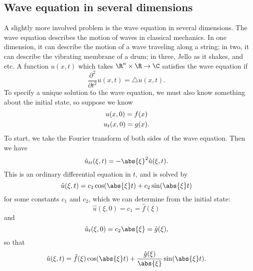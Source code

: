 \subsection{Wave equation in several dimensions}
A slightly more involved problem is the wave equation in several dimensions. The wave equation describes the motion of waves in classical mechanics. In one dimension, it can describe the motion of a wave traveling along a string; in two, it can describe the vibrating membrane of a drum; in three, Jello as it shakes, and etc. A function $u(x, t)$ which takes $\R^n \times \R \to \C$ satisfies the wave equation if
\begin{equation}
\frac{\partial^2}{\partial t^2}u(x, t) = \triangle u(x, t).
\end{equation}
To specify a unique solution to the wave equation, we must also know something about the initial state, so suppose we know
\begin{gather}
u(x, 0) = f(x) \notag \\ u_t(x, 0) = g(x). \notag
\end{gather}
To start, we take the Fourier transform of both sides of the wave equation. Then we have
\[
\hat{u}_{tt}(\xi, t) = - \abs{\xi}^2\hat{u}(\xi, t).
\]
This is an ordinary differential equation in $t$, and is solved by
\[
	\hat{u}(\xi, t) = c_1\cos(\abs{\xi}t) + c_2\sin(\abs{\xi}t)
\]
for some constants $c_1$ and $c_2$, which we can determine from the initial state:
\[
	\hat{u}(\xi, 0) = c_1 = \hat{f}(\xi)
\]
and
\[
	\hat{u}_t(\xi, 0) = c_2\abs{\xi} = \hat{g}(\xi),
\]
so that
\[
	\hat{u}(\xi, t) = \hat{f}(\xi)\cos(\abs{\xi}t) + \frac{\hat{g}(\xi)}{\abs{\xi}}\sin(\abs{\xi}t).
\]